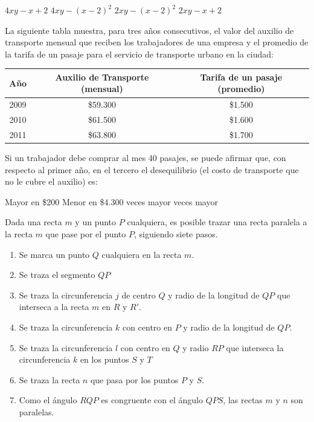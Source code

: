 \documentclass[10pt,addpoints]{exam}
\begin{document}
\begin{questions}
\begin{oneparchoices}
\choice $4xy-x+2$
\CorrectChoice $4xy-(x-2)^{2}$
\choice $2xy-(x-2)^{2}$
\choice $2xy-x+2$
\end{oneparchoices}
\question La siguiente tabla muestra, para tres años consecutivos, el valor del auxilio de transporte mensual que reciben los trabajadores de una empresa y el promedio de la tarifa de un pasaje para el servicio de transporte urbano en la ciudad:
\begin{center}
\begin{tabular}{|c|c|c|}
\hline 
Año & Auxilio de Transporte (mensual) & Tarifa de un pasaje (promedio) \\ 
\hline 
2009 & \$59.300 & \$1.500 \\ 
\hline 
2010 & \$61.500 & \$1.600 \\ 
\hline 
2011 & \$63.800 & \$1.700 \\ 
\hline 
\end{tabular} 
\end{center}
Si un trabajador debe comprar al mes 40 pasajes, se puede afirmar que, con respecto al primer año, en el tercero el desequilibrio (el costo de transporte que no le cubre el auxilio) es:
\begin{choices}
\begin{multicols}{2}
\choice Mayor en \$200
\choice Menor en \$4.300
 veces mayor
 veces mayor
\end{multicols}
\end{choices}
\question Dada una recta $m$ y un punto $P$ cualquiera, es posible trazar una recta paralela a la recta $m$ que pase por el punto $P$, siguiendo siete pasos.
\begin{enumerate}
\item Se marca un punto $Q$ cualquiera en la recta $m$.
\item Se traza el segmento $QP$
\item Se traza la circunferencia $j$ de centro $Q$ y radio de la longitud de $QP$ que interseca a la recta $m$ en $R$ y $R'$.
\item Se traza la circunferencia $k$ con centro en $P$ y radio de la longitud de $QP$.
\item Se traza la circunferencia $l$ con centro en $Q$ y radio $RP$ que interseca la circunferencia $k$ en los puntos $S$ y $T$
\item Se traza la recta $n$ que pasa por los puntos $P$ y $S$.
\item Como el ángulo $RQP$ es congruente con el ángulo $QPS$, las rectas $m$ y $n$ son paralelas.

\end{enumerate}
\end{questions}
\end{document}
